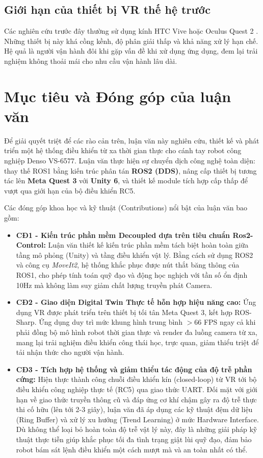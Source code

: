 \subsection{Giới hạn của thiết bị VR thế hệ trước}
Các nghiên cứu trước đây thường sử dụng kính HTC Vive hoặc Oculus Quest 2 \cite{chen2023comparing, naceri2021vicarios}. Những thiết bị này khá cồng kềnh, độ phân giải thấp và khả năng xử lý hạn chế. Hệ quả là người vận hành đôi khi gặp vấn đề khi xử dụng ứng dụng, đem lại trải nghiệm không thoải mái cho nhu cầu vận hành lâu dài.

\section{Mục tiêu và Đóng góp của luận văn}
\label{sec:contributions_outline}
Để giải quyết triệt để các rào cản trên, luận văn này nghiên cứu, thiết kế và phát triển một hệ thống điều khiển từ xa thời gian thực cho cánh tay robot công nghiệp Denso VS-6577. Luận văn thực hiện sự chuyển dịch công nghệ toàn diện: thay thế ROS1 bằng kiến trúc phân tán \textbf{ROS2 (DDS)}, nâng cấp thiết bị tương tác lên \textbf{Meta Quest 3} với \textbf{Unity 6}, và thiết kế module tích hợp cấp thấp để vượt qua giới hạn của bộ điều khiển RC5.

Các đóng góp khoa học và kỹ thuật (Contributions) nổi bật của luận văn bao gồm:
\begin{itemize}
    \item \textbf{CĐ1 - Kiến trúc phần mềm Decoupled dựa trên tiêu chuẩn Ros2-Control:} Luận văn thiết kế kiến trúc phần mềm tách biệt hoàn toàn giữa tầng mô phỏng (Unity) và tầng điều khiển vật lý. Bằng cách sử dụng ROS2 và công cụ \textit{MoveIt2}, hệ thống khắc phục được nút thắt băng thông của ROS1, cho phép tính toán quỹ đạo và động học nghịch với tần số ổn định 10Hz mà không làm suy giảm chất lượng truyền phát Camera.
    \item \textbf{CĐ2 - Giao diện Digital Twin Thực tế hỗn hợp hiệu năng cao:} Ứng dụng VR được phát triển trên thiết bị tối tân Meta Quest 3, kết hợp ROS-Sharp. Ứng dụng duy trì mức khung hình trung bình $>66$ FPS ngay cả khi phải đồng bộ mô hình robot thời gian thực và render đa luồng camera từ xa, mang lại trải nghiệm điều khiển công thái học, trực quan, giảm thiểu triệt để tải nhận thức cho người vận hành.
    \item \textbf{CĐ3 - Tích hợp hệ thống và giảm thiểu tác động của độ trễ phần cứng:} Hiện thực thành công chuỗi điều khiển kín (closed-loop) từ VR tới bộ điều khiển công nghiệp thực tế (RC5) qua giao thức UART. Đối mặt với giới hạn về giao thức truyền thông cũ và đáp ứng cơ khí chậm gây ra độ trễ thực thi cố hữu (lên tới 2-3 giây), luận văn đã áp dụng các kỹ thuật đệm dữ liệu (Ring Buffer) và xử lý xu hướng (Trend Learning) ở mức Hardware Interface. Dù không thể loại bỏ hoàn toàn độ trễ vật lý này, đây là những giải pháp kỹ thuật thực tiễn giúp khắc phục tối đa tình trạng giật lùi quỹ đạo, đảm bảo robot bám sát lệnh điều khiển một cách mượt mà và an toàn nhất có thể.
\end{itemize}

